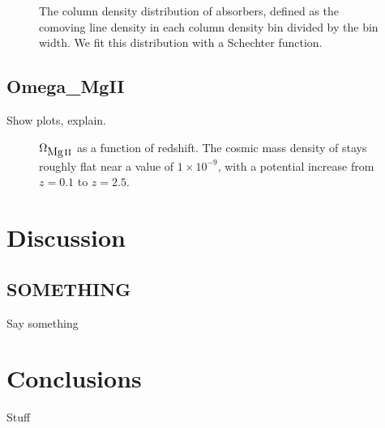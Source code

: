 \message{ !name(Paper_v1.tex)}\documentclass[iop,apj,numberedappendix,appendixfloats,twocolappendix]{emulateapj}
\begin{document}
\begin{figure*}[bth]
\caption{The column density distribution of {\MgII} absorbers, defined as the comoving line density in each column density bin divided by the bin width. We fit this distribution with a Schechter function.}
\label{fig:dndx_cuts}
\end{figure*}

\subsection{Omega\_MgII}
\label{omegamgii}

Show plots, explain.

\begin{figure*}[bth]
\caption{$\Omega_{\hbox{{\rm Mg}\kern 0.1em{\sc ii}}}$ as a function of redshift. The cosmic mass density of {\MgII} stays roughly flat near a value of $1 \times 10^{-9}$, with a potential increase from $z = 0.1$ to $z = 2.5$.}
\label{fig:omegaMgII}
\end{figure*}


\section{Discussion}
\label{sec:discussion}

\subsection{SOMETHING}
Say something

\section{Conclusions}
\label{sec:conclusion}

Stuff





\end{document}
